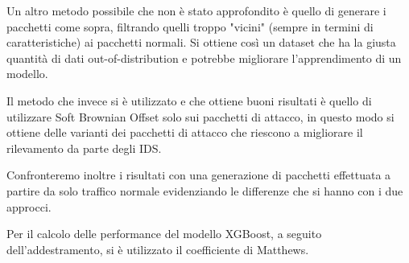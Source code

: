 Un altro metodo possibile che non è stato approfondito è quello di generare i pacchetti come sopra, filtrando quelli troppo "vicini" (sempre in termini di caratteristiche) ai pacchetti normali. Si ottiene così un dataset che ha la giusta quantità di dati out-of-distribution e potrebbe migliorare l'apprendimento di un modello.

Il metodo che invece si è utilizzato e che  ottiene buoni risultati è quello di utilizzare Soft Brownian Offset solo sui pacchetti di attacco, in questo modo si ottiene delle varianti dei pacchetti di attacco che riescono a migliorare il rilevamento da parte degli IDS.

Confronteremo inoltre i risultati con una generazione di pacchetti effettuata a partire da solo traffico normale evidenziando le differenze che si hanno con i due approcci.

Per il calcolo delle performance del modello XGBoost, a seguito dell'addestramento, si è utilizzato il coefficiente di Matthews.



%
%
%
%
%
%
%
